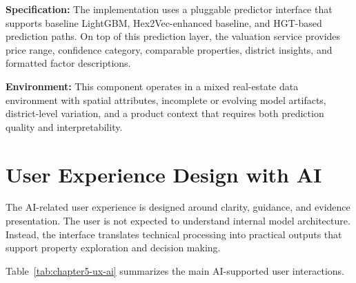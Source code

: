 \textbf{Specification:} The implementation uses a pluggable predictor interface that supports baseline LightGBM, Hex2Vec-enhanced baseline, and HGT-based prediction paths. On top of this prediction layer, the valuation service provides price range, confidence category, comparable properties, district insights, and formatted factor descriptions.

\textbf{Environment:} This component operates in a mixed real-estate data environment with spatial attributes, incomplete or evolving model artifacts, district-level variation, and a product context that requires both prediction quality and interpretability.

\section{User Experience Design with AI}

The AI-related user experience is designed around clarity, guidance, and evidence presentation. The user is not expected to understand internal model architecture. Instead, the interface translates technical processing into practical outputs that support property exploration and decision making.

Table~\ref{tab:chapter5-ux-ai} summarizes the main AI-supported user interactions.

